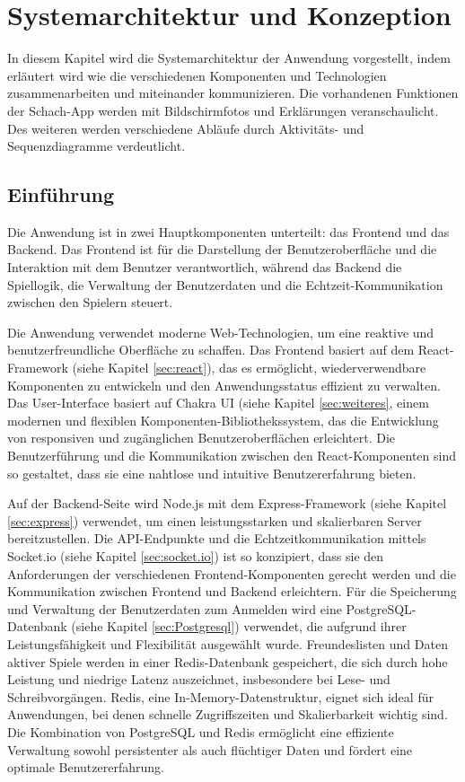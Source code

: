        
\chapter{Systemarchitektur und Konzeption}
In diesem Kapitel wird die Systemarchitektur der Anwendung vorgestellt, indem erläutert wird wie die verschiedenen Komponenten und Technologien zusammenarbeiten und miteinander kommunizieren. Die vorhandenen Funktionen der Schach-App werden mit Bildschirmfotos und Erklärungen veranschaulicht. Des weiteren werden verschiedene Abläufe durch Aktivitäts- und Sequenzdiagramme verdeutlicht.
\section{Einführung}
Die Anwendung ist in zwei Hauptkomponenten unterteilt: das Frontend und das Backend. Das Frontend ist für die Darstellung der Benutzeroberfläche und die Interaktion mit dem Benutzer verantwortlich, während das Backend die Spiellogik, die Verwaltung der Benutzerdaten und die Echtzeit-Kommunikation zwischen den Spielern steuert.

Die Anwendung verwendet moderne Web-Technologien, um eine reaktive und benutzerfreundliche Oberfläche zu schaffen. Das Frontend basiert auf dem React-Framework (siehe Kapitel \ref{sec:react}), das es ermöglicht, wiederverwendbare Komponenten zu entwickeln und den Anwendungsstatus effizient zu verwalten. Das User-Interface basiert auf Chakra UI (siehe Kapitel \ref{sec:weiteres}, einem modernen und flexiblen Komponenten-Bibliothekssystem, das die Entwicklung von responsiven und zugänglichen Benutzeroberflächen erleichtert. Die Benutzerführung und die Kommunikation zwischen den React-Komponenten sind so gestaltet, dass sie eine nahtlose und intuitive Benutzererfahrung bieten.

Auf der Backend-Seite wird Node.js mit dem Express-Framework (siehe Kapitel \ref{sec:express}) verwendet, um einen leistungsstarken und skalierbaren Server bereitzustellen. Die API-Endpunkte und die Echtzeitkommunikation mittels Socket.io (siehe Kapitel \ref{sec:socket.io}) ist so konzipiert, dass sie den Anforderungen der verschiedenen Frontend-Komponenten gerecht werden und die Kommunikation zwischen Frontend und Backend erleichtern. Für die Speicherung und Verwaltung der Benutzerdaten zum Anmelden wird eine PostgreSQL-Datenbank  (siehe Kapitel \ref{sec:Postgresql}) verwendet, die aufgrund ihrer Leistungsfähigkeit und Flexibilität ausgewählt wurde. Freundeslisten und Daten aktiver Spiele werden in einer Redis-Datenbank gespeichert, die sich durch hohe Leistung und niedrige Latenz auszeichnet, insbesondere bei Lese- und Schreibvorgängen. Redis, eine In-Memory-Datenstruktur, eignet sich ideal für Anwendungen, bei denen schnelle Zugriffszeiten und Skalierbarkeit wichtig sind. Die Kombination von PostgreSQL und Redis ermöglicht eine effiziente Verwaltung sowohl persistenter als auch flüchtiger Daten und fördert eine optimale Benutzererfahrung.
